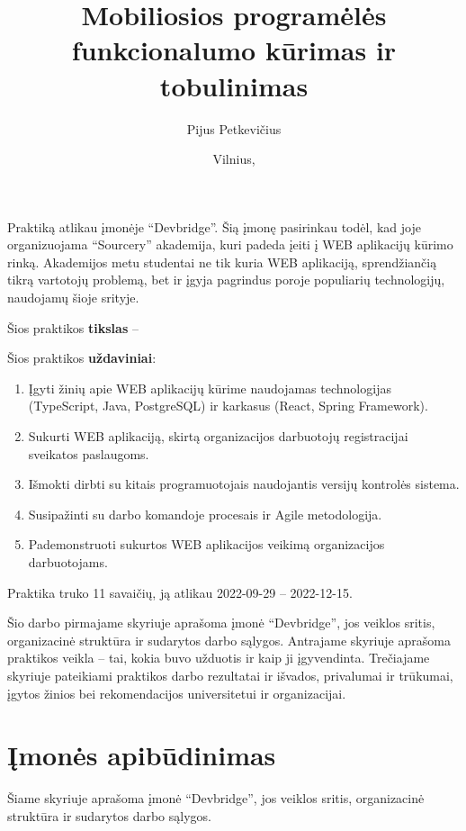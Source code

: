 \documentclass{VUMIFPSPraktika}
\author{Pijus Petkevičius}
\title{Mobiliosios programėlės funkcionalumo kūrimas ir tobulinimas}
\date{Vilnius, \the\year}
\begin{document}
\maketitle

\tableofcontents

Praktiką atlikau įmonėje \enquote{Devbridge}. Šią įmonę pasirinkau todėl, kad joje organizuojama \enquote{Sourcery} akademija, kuri padeda įeiti į WEB aplikacijų kūrimo rinką. Akademijos metu studentai ne tik kuria WEB aplikaciją, sprendžiančią tikrą vartotojų problemą, bet ir įgyja pagrindus poroje populiarių technologijų, naudojamų šioje srityje.
\bigskip

Šios praktikos \textbf{tikslas} -- 
\bigskip

Šios praktikos \textbf{uždaviniai}:
\begin{enumerate}
    \item Įgyti žinių apie WEB aplikacijų kūrime naudojamas technologijas (TypeScript, Java, PostgreSQL) ir karkasus (React, Spring Framework).
    \item Sukurti WEB aplikaciją, skirtą organizacijos darbuotojų registracijai sveikatos paslaugoms.
    \item Išmokti dirbti su kitais programuotojais naudojantis versijų kontrolės sistema.
    \item Susipažinti su darbo komandoje procesais ir Agile metodologija.
    \item Pademonstruoti sukurtos WEB aplikacijos veikimą organizacijos darbuotojams.
\end{enumerate}
\bigskip

Praktika truko 11 savaičių, ją atlikau 2022-09-29 -- 2022-12-15.

Šio darbo pirmajame skyriuje aprašoma įmonė \enquote{Devbridge}, jos veiklos sritis, organizacinė struktūra ir sudarytos darbo sąlygos. Antrajame skyriuje aprašoma praktikos veikla -- tai, kokia buvo užduotis ir kaip ji įgyvendinta. Trečiajame skyriuje pateikiami praktikos darbo rezultatai ir išvados, privalumai ir trūkumai, įgytos žinios bei rekomendacijos universitetui ir organizacijai.

\section{Įmonės apibūdinimas}
Šiame skyriuje aprašoma įmonė \enquote{Devbridge}, jos veiklos sritis, organizacinė struktūra ir sudarytos darbo sąlygos.
\end{document}
